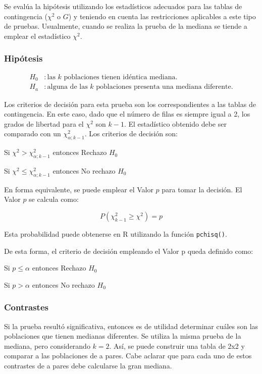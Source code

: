 \documentclass[]{book}
\theoremstyle{definition}
\theoremstyle{definition}
\theoremstyle{definition}
\theoremstyle{remark}
\begin{document}
Se evalúa la hipótesis utilizando los estadísticos adecuados para las
tablas de contingencia (\(\chi^{2}\) o \(G\)) y teniendo en cuenta las
restricciones aplicables a este tipo de pruebas. Usualmente, cuando se
realiza la prueba de la mediana se tiende a emplear el estadístico
\(\chi^{2}\).

\hypertarget{hipotesis-2}{%
\subsubsection{Hipótesis}\label{hipotesis-2}}

\[
\begin{aligned}
H_{0}&: \text{las }k\text{ poblaciones tienen idéntica mediana.}\\
H_{a}&: \text{alguna de las } k\text{ poblaciones presenta una mediana diferente.}
\end{aligned}
\]

Los criterios de decisión para esta prueba son los correspondientes a
las tablas de contingencia. En este caso, dado que el número de filas es
siempre igual a 2, los grados de libertad para el \(\chi^{2}\) son
\(k - 1\). El estadístico obtenido debe ser comparado con un
\(\chi_{\alpha;k - 1}^{2}\). Los criterios de decisión son:

Si \(\chi^{2} > \chi_{\alpha;k - 1}^{2}\) entonces Rechazo \(H_{0}\)

Si \(\chi^{2} \leq \chi_{\alpha;k - 1}^{2}\) entonces No rechazo
\(H_{0}\)

En forma equivalente, se puede emplear el Valor \(p\) para tomar la
decisión. El Valor \(p\) se calcula como:

\[
P\left( \chi_{k - 1}^{2} \geq \chi^{2} \right) = p
\]

Esta probabilidad puede obtenerse en R utilizando la función
\texttt{pchisq()}.

De esta forma, el criterio de decisión empleando el Valor p queda
definido como:

Si \(p \leq \alpha\) entonces Rechazo \(H_{0}\)

Si \(p > \alpha\) entonces No rechazo \(H_{0}\)

\hypertarget{contrastes-2}{%
\subsubsection{Contrastes}\label{contrastes-2}}

Si la prueba resultó significativa, entonces es de utilidad determinar
cuáles son las poblaciones que tienen medianas diferentes. Se utiliza la
misma prueba de la mediana, pero considerando \(k = 2\). Así, se puede
construir una tabla de 2x2 y comparar a las poblaciones de a pares. Cabe
aclarar que para cada uno de estos contrastes de a pares debe calcularse
la gran mediana.
\end{document}
